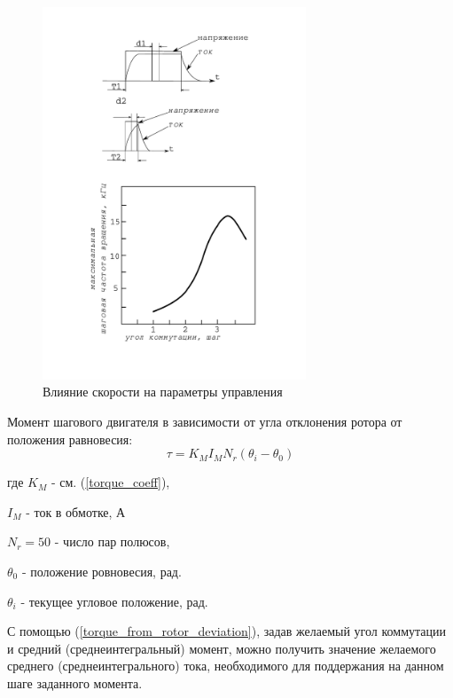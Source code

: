 \begin{figure}
    \centering
    \includegraphics[width=0.7\textwidth, keepaspectratio]{./src/pictures/max_step_motor_by_com_angle}
    \caption{Влияние скорости на параметры управления}
    \label{graph_speed_and_angle_comutation}
\end{figure}

Момент шагового двигателя в зависимости от угла отклонения ротора от положения равновесия:
\begin{equation}
    \label{torque_from_rotor_deviation}
    \tau = K_{M} I_{M} N_{r} ( \theta_{i} - \theta_{0} )
\end{equation}

где $K_{M}$ - см. (\ref{torque_coeff}),

$I_{M}$ - ток в обмотке, А

$N_{r} = 50$ - число пар полюсов,

$\theta_{0}$ - положение ровновесия, рад.

$\theta_{i}$ - текущее угловое положение, рад.
\newline

С помощью (\ref{torque_from_rotor_deviation}), задав желаемый угол коммутации и
средний (среднеинтегральный) момент, можно получить значение желаемого среднего
(среднеинтегрального) тока, необходимого для поддержания на данном шаге заданного момента.

